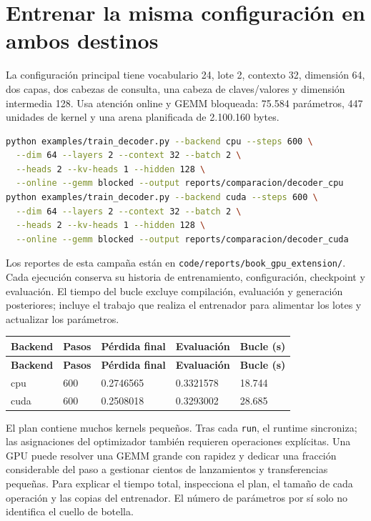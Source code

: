 \documentclass[12pt,a4paper,oneside]{report}
\begin{document}
\section{Entrenar la misma configuración en ambos destinos}
La configuración principal tiene vocabulario 24, lote 2, contexto 32, dimensión 64, dos capas, dos cabezas de consulta, una cabeza de claves/valores y dimensión intermedia 128. Usa atención online y GEMM bloqueada: 75.584 parámetros, 447 unidades de kernel y una arena planificada de 2.100.160 bytes.

\begin{lstlisting}[language=bash]
python examples/train_decoder.py --backend cpu --steps 600 \
  --dim 64 --layers 2 --context 32 --batch 2 \
  --heads 2 --kv-heads 1 --hidden 128 \
  --online --gemm blocked --output reports/comparacion/decoder_cpu
python examples/train_decoder.py --backend cuda --steps 600 \
  --dim 64 --layers 2 --context 32 --batch 2 \
  --heads 2 --kv-heads 1 --hidden 128 \
  --online --gemm blocked --output reports/comparacion/decoder_cuda
\end{lstlisting}
Los reportes de esta campaña están en \texttt{code/reports\allowbreak{}/book\_gpu\_ex\allowbreak{}tension/}. Cada ejecución conserva su historia de entrenamiento, configuración, checkpoint y evaluación. El tiempo del bucle excluye compilación, evaluación y generación posteriores; incluye el trabajo que realiza el entrenador para alimentar los lotes y actualizar los parámetros.

{\small
\begin{longtable}{@{}P{0.17\textwidth}P{0.18\textwidth}P{0.18\textwidth}P{0.18\textwidth}P{0.17\textwidth}@{}}
\toprule
\textbf{Backend} & \textbf{Pasos} & \textbf{Pérdida final} & \textbf{Evaluación} & \textbf{Bucle (s)}\\
\midrule
\endfirsthead
\toprule
\textbf{Backend} & \textbf{Pasos} & \textbf{Pérdida final} & \textbf{Evaluación} & \textbf{Bucle (s)}\\
\midrule
\endhead
cpu & 600 & 0.2746565 & 0.3321578 & 18.744\\
cuda & 600 & 0.2508018 & 0.3293002 & 28.685\\
\bottomrule
\end{longtable}
}
El plan contiene muchos kernels pequeños. Tras cada \texttt{run}, el runtime sincroniza; las asignaciones del optimizador también requieren operaciones explícitas. Una GPU puede resolver una GEMM grande con rapidez y dedicar una fracción considerable del paso a gestionar cientos de lanzamientos y transferencias pequeñas. Para explicar el tiempo total, inspecciona el plan, el tamaño de cada operación y las copias del entrenador. El número de parámetros por sí solo no identifica el cuello de botella.
\end{document}

